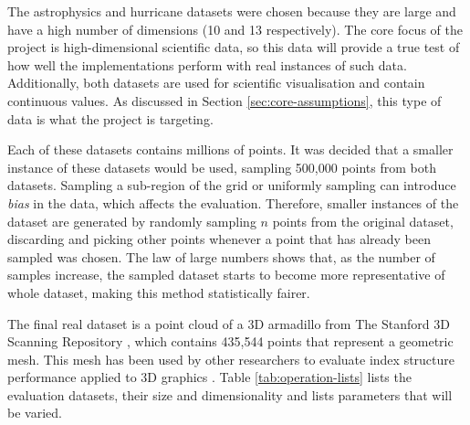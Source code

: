 The astrophysics and hurricane datasets were chosen because they are large and have a high number of dimensions (10 and 13 respectively). The core focus of the project is high-dimensional scientific data, so this data will provide a true test of how well the implementations perform with real instances of such data. Additionally, both datasets are used for scientific visualisation and contain continuous values. As discussed in Section \ref{sec:core-assumptions}, this type of data is what the project is targeting.

Each of these datasets contains millions of points. It was decided that a smaller instance of these datasets would be used, sampling 500,000 points from both datasets. Sampling a sub-region of the grid or uniformly sampling can introduce \textit{bias} in the data, which affects the evaluation. Therefore, smaller instances of the dataset are generated by randomly sampling $n$ points from the original dataset, discarding and picking other points whenever a point that has already been sampled was chosen. The law of large numbers \cite{large-sample-theory} shows that, as the number of samples increase, the sampled dataset starts to become more representative of whole dataset, making this method statistically fairer.

The final real dataset is a point cloud of a 3D armadillo from The Stanford 3D Scanning Repository \cite{armadillo-mesh}, which contains 435,544 points that represent a geometric mesh. This mesh has been used by other researchers to evaluate index structure performance applied to 3D graphics \cite{kd-tree-gpu, accelerating-kdtree-nn}. Table \ref{tab:operation-lists} lists the evaluation datasets, their size and dimensionality and lists parameters that will be varied.

